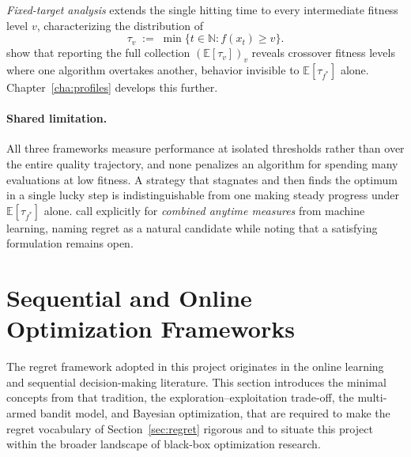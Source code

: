 \textit{Fixed-target analysis} extends the single hitting time to every
intermediate fitness level $v$, characterizing the distribution of
\[
  \tau_v \;:=\; \min\bigl\{t \in \mathbb{N} : f(x_t) \geq v\bigr\}.
\]
\citet{pinto2018practice} show that reporting the full
collection $(\mathbb{E}[\tau_v])_v$ reveals crossover fitness levels where
one algorithm overtakes another, behavior invisible to $\mathbb{E}[\tau_{f^*}]$
alone. Chapter~\ref{cha:profiles} develops this further.

\paragraph{Shared limitation.}
\label{subsubsec:perf-limitations}

All three frameworks measure performance at isolated thresholds rather than
over the entire quality trajectory, and none penalizes an algorithm for spending
many evaluations at low fitness. A strategy that stagnates and then finds the
optimum in a single lucky step is indistinguishable from one making steady
progress under $\mathbb{E}[\tau_{f^*}]$ alone.
\citet{pinto2018practice} call explicitly for \textit{combined anytime
measures} from machine learning, naming regret as a natural candidate while
noting that a satisfying formulation remains open.

\section{Sequential and Online Optimization Frameworks}
\label{sec:online}
The regret framework adopted in this project originates in the
online learning and sequential decision-making literature. This
section introduces the
minimal concepts from that tradition, the exploration--exploitation
trade-off, the multi-armed bandit model, and Bayesian optimization,
that are required to make the regret vocabulary of
Section~\ref{sec:regret} rigorous and to situate this project
within the broader landscape of black-box optimization research.

